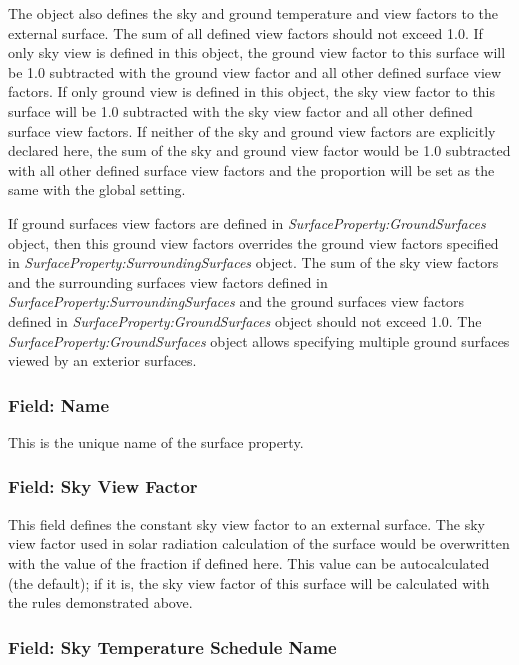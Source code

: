 The object also defines the sky and ground temperature and view factors to the external surface. The sum of all defined view factors should not exceed 1.0. If only sky view is defined in this object, the ground view factor to this surface will be 1.0 subtracted with the ground view factor and all other defined surface view factors. If only ground view is defined in this object, the sky view factor to this surface will be 1.0 subtracted with the sky view factor and all other defined surface view factors. If neither of the sky and ground view factors are explicitly declared here, the sum of the sky and ground view factor would be 1.0 subtracted with all other defined surface view factors and the proportion will be set as the same with the global setting.

If ground surfaces view factors are defined in \textit{SurfaceProperty:GroundSurfaces} object, then this ground view factors overrides the ground view factors specified in \textit{SurfaceProperty:SurroundingSurfaces} object. The sum of the sky view factors and the surrounding surfaces view factors defined in \textit{SurfaceProperty:SurroundingSurfaces} and the ground surfaces view factors defined in \textit{SurfaceProperty:GroundSurfaces} object should not exceed 1.0. The \textit{SurfaceProperty:GroundSurfaces} object allows specifying multiple ground surfaces viewed by an exterior surfaces.

\subsubsection{Field: Name}\label{field-srd-surfs-name}

This is the unique name of the surface property.

\subsubsection{Field: Sky View Factor}\label{field-sky-view-factor}

This field defines the constant sky view factor to an external surface. The sky view factor used in solar radiation calculation of the surface would be overwritten with the value of the fraction if defined here. This value can be autocalculated (the default); if it is, the sky view factor of this surface will be calculated with the rules demonstrated above.

\subsubsection{Field: Sky Temperature Schedule Name}\label{field-sky-temperature-schedule-name}

